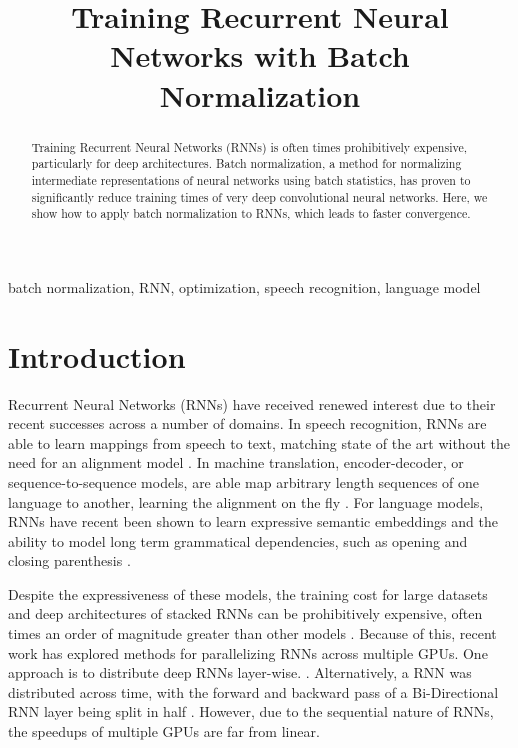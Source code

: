 \documentclass{article}
\title{Training Recurrent Neural Networks with Batch Normalization}
\begin{document}
%
\maketitle
%
\begin{abstract}
Training Recurrent Neural Networks (RNNs) is often times prohibitively expensive, particularly 
for deep architectures. Batch normalization, a method for normalizing intermediate 
representations of neural networks using batch statistics, has proven to significantly reduce 
training times of very deep convolutional neural networks. Here, we show how to apply batch
normalization to RNNs, which leads to faster convergence.

\end{abstract}
%
\begin{keywords}
batch normalization, RNN, optimization, speech recognition, language model
\end{keywords}
%
\section{Introduction}

Recurrent Neural Networks (RNNs) have received renewed interest due to their recent successes across a number of domains. In speech recognition, RNNs are able to learn mappings from speech to text, matching state of the art without the need for an alignment model \citep{graves2013speech}. In machine translation, encoder-decoder, or sequence-to-sequence models, are able map arbitrary length sequences of one language to another, learning the alignment on the fly \citep{sutskever2014sequence}. For language models, RNNs have recent been shown to learn expressive semantic embeddings and the ability to model long term grammatical dependencies, such as opening and closing parenthesis \citep{mikolov2012thesis}.

Despite the expressiveness of these models, the training cost for large datasets and deep architectures of stacked RNNs can be prohibitively expensive, often times an order of magnitude greater than other models \citep{williams2015scaling}. Because of this, recent work has explored methods for parallelizing RNNs across multiple GPUs. One approach is to distribute deep RNNs layer-wise. \citep{sutskever2014sequence}. Alternatively,  a RNN was distributed across time, with the forward and backward pass of a Bi-Directional RNN layer being split in half \citep{hannun2014deepspeech}. However, due to the sequential nature of RNNs, the speedups of multiple GPUs are far from linear.
\end{document}
